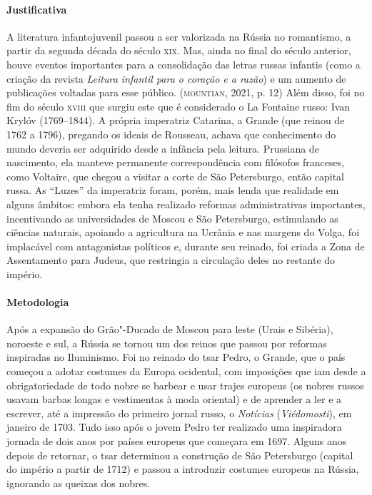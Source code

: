 \documentclass[11pt]{extarticle}
\begin{document}
\paragraph{Justificativa}
A literatura infantojuvenil passou a ser valorizada na Rússia no
romantismo, a partir da segunda década do século \textsc{xix}. Mas, ainda no
final do século anterior, houve eventos importantes para a consolidação
das letras russas infantis (como a criação da revista \emph{Leitura
infantil para o coração e a razão}) e um aumento de publicações voltadas
para esse público. (\textsc{mountian}, 2021, p. 12) Além disso, foi no fim do
século \textsc{xviii} que surgiu este que é considerado o La Fontaine russo: Ivan
Krylóv (1769--1844). A própria imperatriz Catarina, a Grande (que reinou
de 1762 a 1796), pregando os ideais de Rousseau, achava que conhecimento
do mundo deveria ser adquirido desde a infância pela leitura. Prussiana
de nascimento, ela manteve permanente correspondência com filósofos
franceses, como Voltaire, que chegou a visitar a corte de São
Petersburgo, então capital russa. As ``Luzes'' da imperatriz foram, porém,
mais lenda que realidade em alguns âmbitos: embora ela tenha realizado
reformas administrativas importantes, incentivando as universidades de
Moscou e São Petersburgo, estimulando as ciências naturais, apoiando a
agricultura na Ucrânia e nas margens do Volga, foi implacável com
antagonistas políticos e, durante seu reinado, foi criada a Zona de
Assentamento para Judeus, que restringia a circulação deles no restante
do império.


\paragraph{Metodologia}
Após a expansão do Grão"-Ducado de Moscou para leste (Urais e Sibéria),
noroeste e sul, a Rússia se tornou um dos reinos que passou por reformas
inspiradas no Iluminismo. Foi no reinado do tsar Pedro, o Grande, que o
país começou a adotar costumes da Europa ocidental, com imposições que
iam desde a obrigatoriedade de todo nobre se barbear e usar trajes
europeus (os nobres russos usavam barbas longas e vestimentas à moda
oriental) e de aprender a ler e a escrever, até a impressão do primeiro
jornal russo, o \emph{Notícias} (\emph{Viédomosti}), em janeiro de 1703.
Tudo isso após o jovem Pedro ter realizado uma inspiradora jornada de
dois anos por países europeus que começara em 1697. Alguns anos depois
de retornar, o tsar determinou a construção de São Petersburgo (capital
do império a partir de 1712) e passou a introduzir costumes europeus na
Rússia, ignorando as queixas dos nobres.
\end{document}
